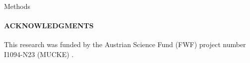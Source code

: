 \documentclass{acm_proc_article-me}
\begin{document}



\begin{section}{Methods}



\end{section}



\paragraph{\textbf{ACKNOWLEDGMENTS}}
This research was funded by the Austrian Science Fund (FWF) project number I1094-N23 (MUCKE) .


  
\end{document}
